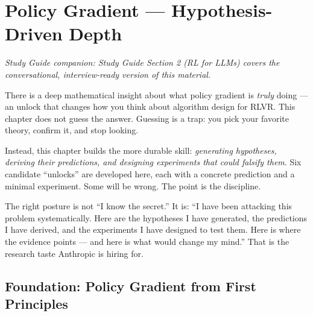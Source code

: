 \section{Policy Gradient --- Hypothesis-Driven Depth}

\smallskip\noindent\textit{Study Guide companion: Study Guide Section 2 (RL for LLMs) covers the conversational, interview-ready version of this material.}
\smallskip

\begin{whythis}
There is a deep mathematical insight about what policy gradient is \textit{truly} doing --- an unlock that changes how you think about algorithm design for RLVR. This chapter does not guess the answer. Guessing is a trap: you pick your favorite theory, confirm it, and stop looking.

Instead, this chapter builds the more durable skill: \textit{generating hypotheses, deriving their predictions, and designing experiments that could falsify them}. Six candidate ``unlocks'' are developed here, each with a concrete prediction and a minimal experiment. Some will be wrong. The point is the discipline.

The right posture is not ``I know the secret.'' It is: ``I have been attacking this problem systematically. Here are the hypotheses I have generated, the predictions I have derived, and the experiments I have designed to test them. Here is where the evidence points --- and here is what would change my mind.'' That is the research taste Anthropic is hiring for.
\end{whythis}

\subsection{Foundation: Policy Gradient from First Principles}

